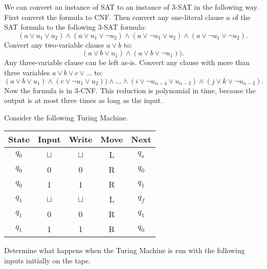 \documentclass[a4paper, 12pt]{exam}
\begin{document}
\begin{questions}
\begin{solution}
    We can convert an instance of SAT to an instance of 3-SAT in the following way.
    First convert the formula to CNF.
    Then convert any one-literal clause $a$ of the SAT formula to the following 3-SAT formula:
      $$(a \lor u_1 \lor u_2) \land (a \lor u_1 \lor \neg u_2) \land (a \lor \neg u_1 \lor u_2) \land (a \lor \neg u_1 \lor \neg u_2).$$
    Convert any two-variable clause $a \lor b$ to:
      $$(a \lor b \lor u_1) \land (a \lor b \lor \neg u_1)).$$
    Any three-variable clause can be left as-is.
    Convert any clause with more than three variables $a \lor b \lor c \lor \ldots$ to:
      $$(a \lor b \lor u_1) \land (c \lor \neg u_1 \lor u_2)) \land \ldots \land (i \lor \neg u_{n-4} \lor u_{n-3}) \land (j \lor k \lor \neg u_{n-3}).$$
    Now the formula is in 3-CNF.
    This reduction is polynomial in time, because the output is at most three times as long as the input.
  \end{solution}


  \question
  Consider the following Turing Machine.
  \begin{table}[H]
    \centering
    \begin{tabular}{ccccc}
      \toprule
          State & Input & Write & Move & Next \\
      \midrule
          $q_0$ & $\sqcup$ & $\sqcup$ & L & $q_a$ \\
          $q_0$ & 0 & 0 & R & $q_0$ \\
          $q_0$ & 1 & 1 & R & $q_1$ \\
      \midrule
          $q_1$ & $\sqcup$ & $\sqcup$ & L & $q_f$ \\
          $q_1$ & 0 & 0 & R & $q_1$ \\
          $q_1$ & 1 & 1 & R & $q_0$ \\
      \bottomrule
      \hline
    \end{tabular}
  \end{table}
  Determine what happens when the Turing Machine is run with the following inputs initially on the tape.
\end{questions}
\end{document}
